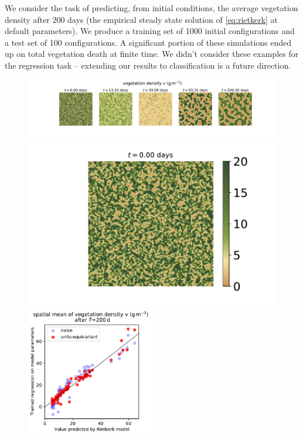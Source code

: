 \documentclass[twoside,11pt]{article}
\begin{document}
We consider the task of predicting, from initial conditions, the average vegetation density after $200$ days (the empirical steady state solution of \eqref{eq:rietkerk} at default parameters). We produce a training set of 1000 initial configurations and a test set of 100 configurations. A significant portion of these simulations ended up on total vegetation death at finite time. We didn't consider these examples for the regression task -- extending our results to classification is a future direction.  
\begin{figure}[tp]
    \centering
    \includegraphics[height=0.21\textwidth]{imgs/row3.pdf}
    \includegraphics[height=0.17\textwidth]{imgs/colorbar3.pdf}
    \\[4ex]
    \includegraphics[width=0.5\textwidth]{imgs/Rietkerk.pdf}

\end{figure}
\end{document}
